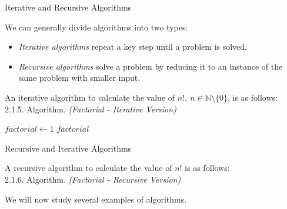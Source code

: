 \documentclass[smaller,hyperref={CJKbookmarks=true}]{beamer}
\newcommand{\N}{\mathbb{N}} \newcommand{\Z}{\mathbb{Z}} \newcommand{\Q}{\mathbb{Q}}
\newcounter{zhuo}[subsection]
\begin{document}
\begin{frame}[t]{Iterative and Recursive Algorithms}
\begin{spacing}{1.05}
We can generally divide algorithms into two types:
\begin{itemize}
  \item \emph{Iterative algorithms} repeat a key step until a problem is solved.
  \item \emph{Recursive algorithms} solve a problem by reducing it to an instance of the same problem with smaller input.
\end{itemize}
An iterative algorithm to calculate the value of $n!,\:n\in\N\setminus\{0\}$, is as follows:\\[4pt]
\alert{2.1.5. Algorithm.} \emph{(Factorial - Iterative Version)}
\IncMargin{1em}
\begin{algorithm}[H]
$factorial\leftarrow1$\;
\Return $factorial$
\end{algorithm}\DecMargin{1em}
\end{spacing}
\end{frame}
\begin{frame}[t]{Recursive and Iterative Algorithms}
\begin{spacing}{1.05}
A recursive algorithm to calculate the value of $n!$ is as follows:\\[5pt]
\alert{2.1.6. Algorithm.} \emph{(Factorial - Recursive Version)}
\IncMargin{1em}
\begin{algorithm}[H]
\end{algorithm}\DecMargin{1em}
\vspace*{5pt}
We will now study several examples of algorithms.
\end{spacing}
\end{frame}
\end{document}
